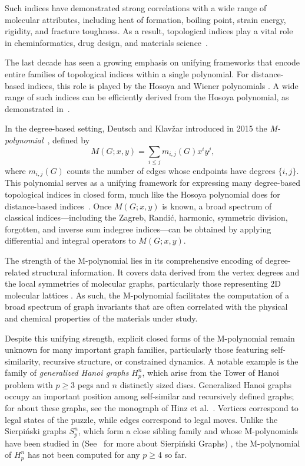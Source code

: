 \documentclass[letterpaper,12pt]{article}
\begin{document}
Such indices have demonstrated strong correlations with a wide range of molecular attributes, including heat of formation, boiling point, strain energy, rigidity, and fracture toughness. As a result, topological indices play a vital role in cheminformatics, drug design, and materials science~\cite{rucker1999topological,klavvzar1996comparison,DENG20113017,bentham,ZHANG1996147,shanmukha2020degree}.

The last decade has seen a growing emphasis on  unifying frameworks  that
encode entire families of topological indices within a single polynomial.
For distance-based indices, this role is played by the Hosoya and Wiener
polynomials \cite{Hosoya1988, Wiener1947}. A wide range of such indices can be efficiently derived from the Hosoya polynomial, as demonstrated in~\cite{Computing}. 


In the degree-based setting, Deutsch and Klavžar introduced in 2015 the
\emph{M-polynomial}~\cite{EmericMploy}, defined by
\[
    M(G;x,y)=\sum_{i\le j} m_{i,j}(G)x^iy^j ,
\]
where $m_{i,j}(G)$ counts the number of edges whose endpoints have degrees
$\{i,j\}$. This polynomial serves as a unifying framework for expressing many degree-based topological indices in closed form, much like the Hosoya polynomial does for distance-based indices~\cite{kwun2017m,Chaudhry03102021}. 
Once $M(G;x,y)$ is known, a broad spectrum of classical indices---including the 
Zagreb, Randić, harmonic, symmetric division, forgotten, and inverse sum 
indegree indices---can be obtained by applying differential and integral 
operators to $M(G;x,y)$.


The strength of the M-polynomial lies in its comprehensive encoding of degree-related structural information. It covers data derived from the vertex degrees and the local symmetries of molecular graphs, particularly those representing 2D molecular lattices \cite{Raheem02042020}. As such, the M-polynomial facilitates the computation of a broad spectrum of graph invariants that are often correlated with the physical and chemical properties of the materials under study.

Despite this unifying strength, explicit closed forms of the M-polynomial remain
unknown for many important graph families, particularly those featuring
self-similarity, recursive structure, or constrained dynamics.
A notable example is the family of \emph{generalized Hanoi graphs} $H_p^n$,
which arise from the Tower of Hanoi problem with $p\ge 3$ pegs and $n$ 
distinctly sized discs. Generalized Hanoi graphs occupy an important position among self-similar and
recursively defined graphs; for about these graphs,  
see the monograph of Hinz et al.~\cite[Chapter 5]{hinz2018tower}.
Vertices correspond to legal states of the puzzle, while edges correspond to
legal moves. 
Unlike the Sierpiński graphs $S_p^n$, which form a close sibling family and whose
M-polynomials have been studied in \cite{ishfaq2024topological,Fan,JahangeerBaig03102019}  (See~\cite[Chapter 4]{hinz2018tower} for more about Sierpiński Graphs) ,   the M-polynomial of $H_p^n$ has not been computed
for any $p\ge 4$ so far. 
\end{document}
